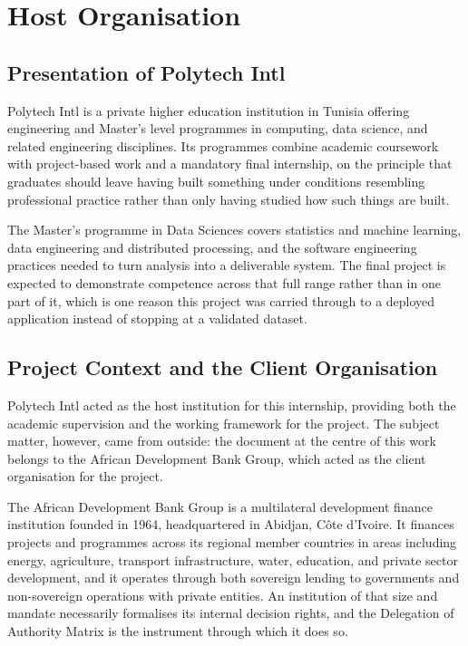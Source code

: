 \section{Host Organisation}

\subsection{Presentation of Polytech Intl}

Polytech Intl is a private higher education institution in Tunisia offering engineering and Master's level programmes in computing, data science, and related engineering disciplines. Its programmes combine academic coursework with project-based work and a mandatory final internship, on the principle that graduates should leave having built something under conditions resembling professional practice rather than only having studied how such things are built.

The Master's programme in Data Sciences covers statistics and machine learning, data engineering and distributed processing, and the software engineering practices needed to turn analysis into a deliverable system. The final project is expected to demonstrate competence across that full range rather than in one part of it, which is one reason this project was carried through to a deployed application instead of stopping at a validated dataset.

\subsection{Project Context and the Client Organisation}

Polytech Intl acted as the host institution for this internship, providing both the academic supervision and the working framework for the project. The subject matter, however, came from outside: the document at the centre of this work belongs to the African Development Bank Group, which acted as the client organisation for the project.

The African Development Bank Group is a multilateral development finance institution founded in 1964, headquartered in Abidjan, C\^ote d'Ivoire. It finances projects and programmes across its regional member countries in areas including energy, agriculture, transport infrastructure, water, education, and private sector development, and it operates through both sovereign lending to governments and non-sovereign operations with private entities. An institution of that size and mandate necessarily formalises its internal decision rights, and the Delegation of Authority Matrix is the instrument through which it does so.

